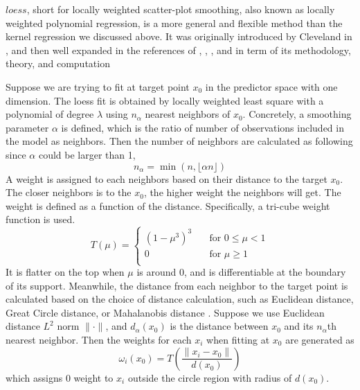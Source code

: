 $loess$, short for locally weighted scatter-plot smoothing, also known as locally
weighted polynomial regression, is a more general and flexible
method than the kernel regression we discussed above. It was originally introduced 
by Cleveland in \cite{Cleveland:1979}, and then well expanded in the references 
of \cite{cleveland1988locally}, \cite{cleveland1991computational}, 
\cite{cleveland1988regression}, and \cite{cleveland1996smoothing} in term of its
methodology, theory, and computation

Suppose we are trying to fit at target point $x_0$ in the predictor space with
one dimension. The loess fit is obtained by locally weighted least square with a
polynomial of degree $\lambda$ using $n_{\alpha}$ nearest neighbors of $x_0$. 
Concretely, a smoothing parameter $\alpha$ is defined, which is the ratio of 
number of observations included in the model as neighbors. Then the number of 
neighbors are calculated as following since $\alpha$ could be larger than 1, 
\begin{equation} 
n_{\alpha} = \min(n, \lfloor \alpha n \rfloor)
\end{equation}
A weight is assigned to each neighbors based on their distance to the target $x_0$.
The closer neighbors is to the $x_0$, the higher weight the neighbors will get. The
weight is defined as a function of the distance. Specifically, a tri-cube weight 
function is used.
\begin{equation} 
\label{tricube}
T(\mu) =
  \begin{cases}
    (1 - \mu^3)^3       & \quad \text{for } 0 \le \mu < 1\\
    0  & \quad \text{for } \mu \ge 1\\
  \end{cases}
\end{equation}
It is flatter on the top when $\mu$ is around 0, and is differentiable at the 
boundary of its support.
Meanwhile, the distance from each neighbor to the target point is calculated 
based on the choice of distance calculation, such as Euclidean distance, Great 
Circle distance, or Mahalanobis distance \cite{mahalanobis1936}. 
Suppose we use Euclidean distance $L^2$ norm $\|\cdot\|$, and $d_{\alpha}(x_0)$ is 
the distance between $x_0$ and its $n_{\alpha}$th nearest neighbor.
Then the weights for each $x_i$ when fitting at $x_0$ are generated as
\begin{equation} 
\omega_i(x_0) = T \left( \frac{\| x_i - x_0 \|}{d(x_0)} \right)
\end{equation}
which assigns 0 weight to $x_i$ outside the circle region with radius of $d(x_0)$.


